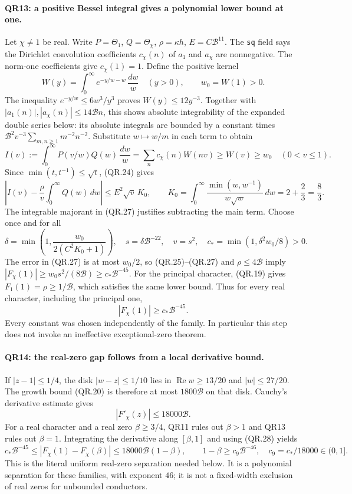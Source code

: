 \paragraph{QR13: a positive Bessel integral gives a polynomial lower bound at one.}
Let $\chi\ne1$ be real. Write $P=\Theta_1$, $Q=\Theta_\chi$,
$\rho=\kappa h$, $E=C\mathcal B^{11}$. The \texttt{sq} field
says the Dirichlet convolution coefficients $c_\chi(n)$ of
$a_1$ and $a_\chi$ are nonnegative. The norm-one coefficients give
$c_\chi(1)=1$. Define the positive kernel
\[
 W(y)=\int_0^\infty e^{-y/w-w}\,\frac{dw}{w}\quad(y>0),
       \qquad w_0=W(1)>0.
\]
The inequality $e^{-y/w}\le6w^3/y^3$ proves $W(y)\le12y^{-3}$.
Together with $|a_1(n)|,|a_\chi(n)|\le14\mathcal B n$, this
shows absolute integrability of the expanded double series below:
its absolute integrals are bounded by a constant times
$\mathcal B^2v^{-3}\sum_{m,n\ge1}m^{-2}n^{-2}$.
Substitute $w\mapsto w/m$ in each term to obtain
\[
 I(v):=\int_0^\infty P(v/w)Q(w)\,\frac{dw}{w}
       =\sum_n c_\chi(n)W(nv)\ge W(v)\ge w_0
                                      \quad(0<v\le1).     \tag{QR.26}
\]
Since $\min(t,t^{-1})\le\sqrt t$, (QR.24) gives
\[
 \left|I(v)-\frac\rho v\int_0^\infty Q(w)\,dw\right|
 \le E^2\sqrt v\,K_0,\qquad
 K_0=\int_0^\infty\frac{\min(w,w^{-1})}{w\sqrt w}\,dw
                    =2+\frac23=\frac83.                  \tag{QR.27}
\]
The integrable majorant in (QR.27) justifies subtracting the main
term. Choose once and for all
\[
 \delta=\min\left(1,\frac{w_0}{2(C^2K_0+1)}\right),\quad
 s=\delta\mathcal B^{-22},\quad v=s^2,\quad
 c_* =\min(1,\delta^2w_0/8)>0.
\]
The error in (QR.27) is at most $w_0/2$, so (QR.25)--(QR.27) and
$\rho\le4\mathcal B$ imply
$|F_\chi(1)|\ge w_0s^2/(8\mathcal B)\ge c_*\mathcal B^{-45}$.
For the principal character, (QR.19) gives
$F_1(1)=\rho\ge1/\mathcal B$, which satisfies the same lower bound.
Thus for every real character, including the principal one,
\[
                      |F_\chi(1)|\ge c_*\mathcal B^{-45}. \tag{QR.28}
\]
Every constant was chosen independently of the family. In particular
this step does not invoke an ineffective exceptional-zero theorem.

\paragraph{QR14: the real-zero gap follows from a local derivative bound.}
If $|z-1|\le1/4$, the disk $|w-z|\le1/10$ lies in
$\operatorname{Re}w\ge13/20$ and $|w|\le27/20$.
The growth bound (QR.20) is therefore at most $1800\mathcal B$
on that disk. Cauchy's derivative estimate gives
\[
                   |F'_\chi(z)|\le18000\mathcal B.        \tag{QR.29}
\]
For a real character and a real zero $\beta\ge3/4$, QR11 rules
out $\beta>1$ and QR13 rules out $\beta=1$. Integrating the derivative
along $[\beta,1]$ and using (QR.28) yields
\[
 c_*\mathcal B^{-45}\le|F_\chi(1)-F_\chi(\beta)|
           \le18000\mathcal B(1-\beta),\qquad
 1-\beta\ge c_9\mathcal B^{-46},\quad
 c_9=c_*/18000\in(0,1].                                  \tag{QR.30}
\]
This is the literal uniform real-zero separation needed below. It
is a polynomial separation for these families, with exponent $46$;
it is not a fixed-width exclusion of real zeros for unbounded
conductors.

